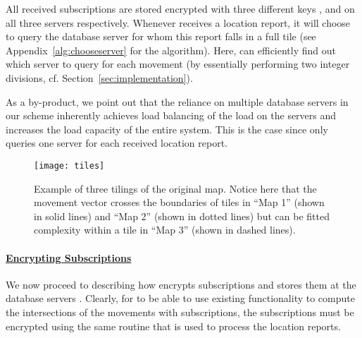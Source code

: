 \documentclass{llncs}
\begin{document}
All received subscriptions are
stored encrypted with three different keys ,  and  on all three servers respectively.  Whenever  receives a location report, it will choose to query the database server  for whom
this report falls in a full tile (see Appendix~\ref{alg:chooseserver} for the algorithm).
Here,  can efficiently find out which server to query for each movement (by essentially performing two integer divisions, cf. Section~\ref{sec:implementation}).




As a by-product, we point out that the reliance on multiple database servers
in our scheme inherently achieves load balancing of the load on the servers and increases the load capacity of the entire system.
This is the case since  only queries one server for each received location report.


\begin{figure}[tb]
	\centering
		\texttt{[image: tiles]}
		\caption{Example of three tilings of the original map. Notice here that the movement vector crosses the boundaries of tiles in ``Map 1'' (shown in solid lines) and ``Map 2'' (shown in dotted lines) but can be fitted complexity within a tile in ``Map 3'' (shown in dashed lines).}
	\label{fig:tiles}
\end{figure}




\paragraph{\underline{Encrypting Subscriptions}\\}

We now proceed to describing how  encrypts subscriptions and stores them at the database servers . Clearly, for  to be able to use existing functionality to compute the intersections of the movements with subscriptions, the subscriptions must be encrypted using the same routine that is used to process the location reports.
\end{document}
